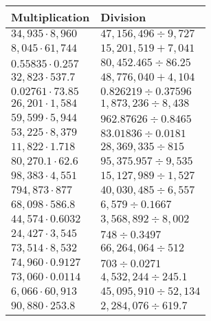 \begin{longtable}[]{@{}ll@{}}
\toprule
Multiplication & Division\tabularnewline
\midrule
\endhead
\(34,935\cdot8,960\) & \(47,156,496÷9,727\)\tabularnewline
\(8,045\cdot61,744\) & \(15,201,519 +7,041\)\tabularnewline
\(0.55835\cdot 0.257\) & \(80,452.465÷86.25\)\tabularnewline
\(32,823\cdot537.7\) & \(48,776,040 +4,104\)\tabularnewline
\(0.02761\cdot73.85\) & \(0.826219 ÷0.37596\)\tabularnewline
\(26,201\cdot1,584\) & \(1,873,236÷8,438\)\tabularnewline
\(59,599\cdot5,944\) & \(962.87626÷0.8465\)\tabularnewline
\(53,225\cdot8,379\) & \(83.01836 ÷0.0181\)\tabularnewline
\(11,822\cdot1.718\) & \(28,369,335÷815\)\tabularnewline
\(80,270.1\cdot62.6\) & \(95,375.957÷9,535\)\tabularnewline
\(98,383\cdot4,551\) & \(15,127,989÷1,527\)\tabularnewline
\(794,873\cdot877\) & \(40,030,485÷6,557\)\tabularnewline
\(68,098\cdot586.8\) & \(6,579÷0.1667\)\tabularnewline
\(44,574\cdot0.6032\) & \(3,568,892÷8,002\)\tabularnewline
\(24,427\cdot3,545\) & \(748÷0.3497\)\tabularnewline
\(73,514\cdot8,532\) & \(66,264,064÷512\)\tabularnewline
\(74,960\cdot0.9127\) & \(703÷0.0271\)\tabularnewline
\(73,060\cdot0.0114\) & \(4,532,244÷245.1\)\tabularnewline
\(6,066\cdot60,913\) & \(45,095,910÷52,134\)\tabularnewline
\(90,880\cdot253.8\) & \(2,284,076÷619.7\)\tabularnewline
\bottomrule
\end{longtable}
